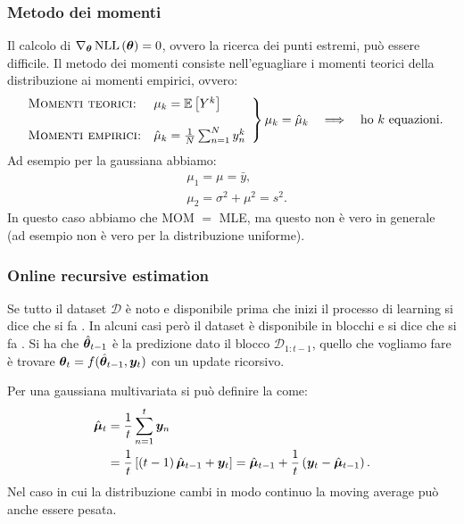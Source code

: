 \documentclass[10pt]{article}
\DeclareMathOperator{\NLL}{NLL}
\newcommand{\pare}[1]{
	\ensuremath{\left(#1\right)}
}
\newcommand{\spare}[1]{
	\ensuremath{\left[#1\right]}
}
\begin{document}
\subsubsection{Metodo dei momenti}
Il calcolo di $\nabla_{\ve{\theta}}\NLL\pare{\ve{\theta}} = 0$, ovvero la
ricerca dei punti estremi, può essere difficile. Il metodo dei momenti consiste
nell'eguagliare i momenti teorici della distribuzione ai momenti empirici,
ovvero:
\begin{equation}
\left.
\begin{array}{ll}
\textsc{Momenti teorici:} & \mu_k = \mathbb{E}\spare{Y^k} \\
\\
\textsc{Momenti empirici:} & \hat{\mu}_k = \frac{1}{N}\sum_{n=1}^N y_n^k
\end{array}
\right\} \mu_k = \hat{\mu}_k \quad\Longrightarrow\quad \text{ho } k \text{ equazioni}.
\end{equation}
Ad esempio per la gaussiana abbiamo:
\begin{align*}
&\mu_1 = \mu = \bar{y}, \\
&\mu_2 = \sigma^2 + \mu^2 = s^2.
\end{align*}
In questo caso abbiamo che MOM \(=\) MLE, ma questo non è vero in generale (ad
esempio non è vero per la distribuzione uniforme).

\subsubsection{Online recursive estimation}
Se tutto il dataset $\mathcal{D}$ è noto e disponibile prima che inizi il
processo di learning si dice che si fa . In alcuni casi però
il dataset è disponibile in blocchi e si dice che si fa . Si
ha che $\hat{\bm{\theta}}_{t-1}$ è la predizione dato il blocco
$\mathcal{D}_{1:t-1}$, quello che vogliamo fare è trovare $\bm{\theta}_t =
f(\hat{\bm{\theta}}_{t-1}, \bm{y}_t)$ con un update ricorsivo.

\begin{definition}
Per una gaussiana multivariata si può definire la  come:
\begin{equation}
\begin{split}
\hat{\ve{\mu}}_t &= \frac{1}{t}\sum_{n=1}^t\ve{y}_n \\
&= \frac{1}{t}\spare{\pare{t-1}\hat{\ve{\mu}}_{t-1} + \ve{y}_t} = \hat{\ve{\mu}}_{t-1} + \frac{1}{t}\pare{\ve{y}_t - \hat{\ve{\mu}}_{t-1}}.
\end{split}
\end{equation}
Nel caso in cui la distribuzione cambi in modo continuo la moving average può
anche essere pesata.
\end{definition}
\end{document}
